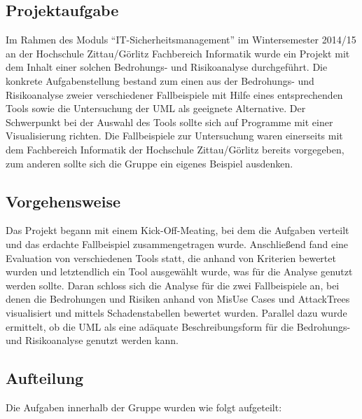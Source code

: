 \subsection{Projektaufgabe}
Im Rahmen des Moduls "`IT-Sicherheitsmanagement"' im Wintersemester 2014/15 an der Hochschule Zittau/Görlitz Fachbereich Informatik wurde ein Projekt mit dem Inhalt einer solchen Bedrohungs- und Risikoanalyse durchgeführt. Die konkrete Aufgabenstellung bestand zum einen aus der Bedrohungs- und Risikoanalyse zweier verschiedener Fallbeispiele mit Hilfe eines entsprechenden Tools sowie die Untersuchung der UML als geeignete Alternative. Der Schwerpunkt bei der Auswahl des Tools sollte sich auf Programme mit einer Visualisierung richten. Die Fallbeispiele zur Untersuchung waren einerseits mit dem Fachbereich Informatik der Hochschule Zittau/Görlitz bereits vorgegeben, zum anderen sollte sich die Gruppe ein eigenes Beispiel ausdenken.

\subsection{Vorgehensweise}
Das Projekt begann mit einem Kick-Off-Meating, bei dem die Aufgaben verteilt und das erdachte Fallbeispiel zusammengetragen wurde. Anschließend fand eine Evaluation von verschiedenen Tools statt, die anhand von Kriterien bewertet wurden und letztendlich ein Tool ausgewählt wurde, was für die Analyse genutzt werden sollte. Daran schloss sich die Analyse für die zwei Fallbeispiele an, bei denen die Bedrohungen und Risiken anhand von MisUse Cases und AttackTrees visualisiert und mittels Schadenstabellen bewertet wurden. Parallel dazu wurde ermittelt, ob die UML als eine adäquate Beschreibungsform für die Bedrohungs- und Risikoanalyse genutzt werden kann.

\subsection{Aufteilung}
Die Aufgaben innerhalb der Gruppe wurden wie folgt aufgeteilt:


